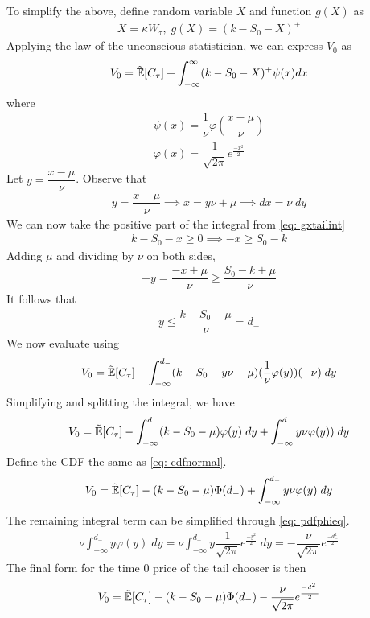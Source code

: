 \documentclass[reqno]{amsart}
\begin{document}
To simplify the above, define random variable $X$ and function $g(X)$ as 
\begin{align} 
     X = \kappa W_\tau, \;g(X) = (k - S_0 - X)^+
\end{align}
Applying the law of the unconscious statistician, we can express $V_0$ as 
\begin{align} \label{eq: gxtailint}
     V_0 = \tilde{\mathbb{E}}[C_\tau] + \int_{-\infty}^{\infty} (k - S_0 - X)^+ \psi(x) dx
\end{align}
where
\begin{align} 
     \psi(x) = \dfrac{1}{\nu} \varphi \left( \dfrac{x - \mu}{\nu} \right)\\
     \label{eq: pdfphieq}
     \varphi(x) = \dfrac{1}{\sqrt{2\pi}} e^\frac{-x^2}{2}
\end{align}
Let $y = \dfrac{x - \mu}{\nu}$. Observe that
\begin{align} \label{eq: ysubst}
     y = \dfrac{x - \mu}{\nu} \implies x = y\nu + \mu \implies dx = \nu \;dy
\end{align}
We can now take the positive part of the integral from \eqref{eq: gxtailint}
\begin{align}
     k - S_0 - x \geq 0 \implies -x \geq S_0 - k
\end{align}
Adding $\mu$ and dividing by $\nu$ on both sides,
\begin{align}
     -y = \dfrac{-x + \mu}{\nu} \geq \dfrac{S_0 - k + \mu}{\nu}
\end{align}
It follows that 
\begin{align}
     y \leq \dfrac{k - S_0 - \mu}{\nu} = d_-
\end{align}
We now evaluate  using 
\begin{align} 
     V_0 = \tilde{\mathbb{E}}[C_\tau] + \int_{-\infty}^{d_-} (k - S_0 - y\nu - \mu) (\dfrac{1}{\nu} \varphi(y)) (-\nu) \;dy
\end{align}
Simplifying and splitting the integral, we have
\begin{align} 
     V_0 = \tilde{\mathbb{E}}[C_\tau] - \int_{-\infty}^{d_-} (k - S_0 - \mu) \varphi(y) \;dy + \int_{-\infty}^{d_-} y\nu \varphi(y)) \;dy
\end{align}
Define the CDF the same as \eqref{eq: cdfnormal}. 
\begin{align} 
     V_0 = \tilde{\mathbb{E}}[C_\tau] - (k - S_0 - \mu) \Phi(d_-) + \int_{-\infty}^{d_-} y\nu \varphi(y) \;dy
\end{align}
The remaining integral term can be simplified through \eqref{eq: pdfphieq}.
\begin{align} 
     \nu \int_{-\infty}^{d_-} y \varphi(y) \;dy = \nu \int_{-\infty}^{d_-} y \dfrac{1}{\sqrt{2\pi}} e^{\frac{-y^2}{2}} \;dy = -\dfrac{\nu}{\sqrt{2\pi}} e^{\frac{-d_-^2}{2}}
\end{align}
The final form for the time 0 price of the tail chooser is then 
\begin{align} 
     V_0 = \tilde{\mathbb{E}}[C_\tau] - (k - S_0 - \mu) \Phi(d_-) -\dfrac{\nu}{\sqrt{2\pi}} e^{\frac{-d_-^2}{2}}
\end{align}
\end{document}
